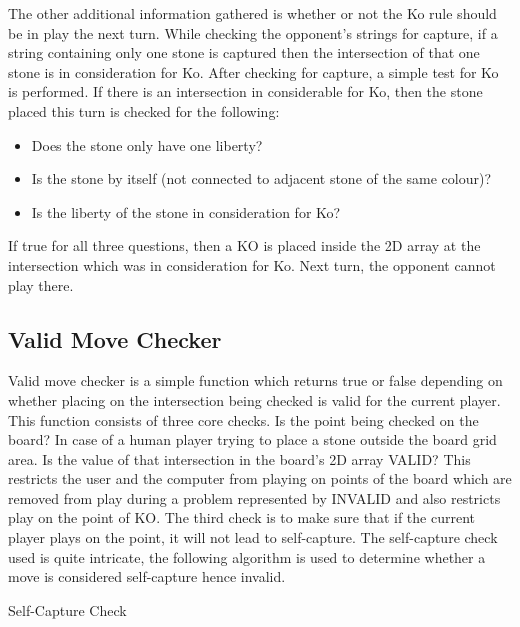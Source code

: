 \documentclass{l4proj}
\begin{document}
The other additional information gathered is whether or not the Ko rule should be in play the next turn. While checking the opponent’s strings for capture, if a string containing only one stone is captured then the intersection of that one stone is in consideration for Ko. After checking for capture, a simple test for Ko is performed. If there is an intersection in considerable for Ko, then the stone placed this turn is checked for the following:

\begin{itemize}
    \item Does the stone only have one liberty?
    \item Is the stone by itself (not connected to adjacent stone of the same colour)?
    \item Is the liberty of the stone in consideration for Ko?
\end{itemize}

If true for all three questions, then a KO is placed inside the 2D array at the intersection which was in consideration for Ko. Next turn, the opponent cannot play there.

\subsection{Valid Move Checker}
Valid move checker is a simple function which returns true or false depending on whether placing on the intersection being checked is valid for the current player. This function consists of three core checks. Is the point being checked on the board? In case of a human player trying to place a stone outside the board grid area. Is the value of that intersection in the board’s 2D array VALID? This restricts the user and the computer from playing on points of the board which are removed from play during a problem represented by INVALID and also restricts play on the point of KO. The third check is to make sure that if the current player plays on the point, it will not lead to self-capture. The self-capture check used is quite intricate, the following algorithm is used to determine whether a move is considered self-capture hence invalid.

\begin{algorithm}[H]
\caption{Self-Capture Check}\label{Self-Capture Check}
    \DontPrintSemicolon
\end{algorithm}
\end{document}
